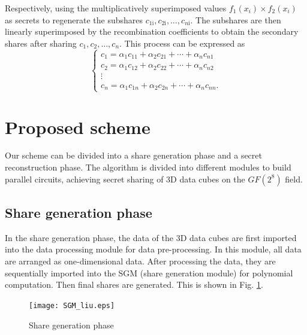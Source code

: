 Respectively, using the multiplicatively superimposed values $f_{1}\left(x_{i}\right)\times  f_{2}\left(x_{i}\right)$ as secrets to regenerate the subshares $
\mathrm{\mathit{c} }_{1 \mathrm{i}}, \mathrm{\mathit{c} }_{2 \mathrm{i}}, \ldots, \mathrm{\mathit{c} }_{n \mathrm{i}}$. The subshares are then linearly superimposed by the recombination coefficients to obtain the secondary shares after sharing $\mathrm{\mathit{c} }_{1}, \mathrm{\mathit{c} }_{2}, \ldots, \mathrm{\mathit{c} }_{n}$. This process can be expressed as
\begin{equation}
\left\{\begin{array}{c}
c_{1}=\alpha_{1} c_{11}+\alpha_{2} c_{21}+\cdots+\alpha_{n} c_{n 1} \\
c_{2}=\alpha_{1} c_{12}+\alpha_{2} c_{22}+\cdots+\alpha_{n} c_{n 2} \\
\vdots \\
c_{n}=\alpha_{1} c_{1 n}+\alpha_{2} c_{2 n}+\cdots+\alpha_{n} c_{n n}.
\end{array}\right.
\end{equation}
\section{Proposed scheme}\label{Sec_proposed}

Our scheme can be divided into a share generation phase and a secret reconstruction phase. The algorithm is divided into different modules to build parallel circuits, achieving secret sharing of 3D data cubes on the $GF (2^{8})$ field.

\subsection{Share generation phase}\label{subsec_NC-BPDVC_framework}

In the share generation phase, the data of the 3D data cubes are first imported into the data processing module for data pre-processing. In this module, all data are arranged as one-dimensional data. After processing the data, they are sequentially imported into the SGM (share generation module) for polynomial computation. Then final shares are generated. This is shown in Fig. \ref{fig04}.

\begin{figure}
	\begin{center}
	\texttt{[image: SGM\_liu.eps]}
	\caption{{\color{red}Share generation phase}}
	\label{fig04}       %
	\vspace{-2.0em}
	\end{center}
\end{figure}

